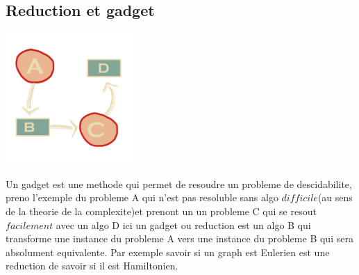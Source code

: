 \documentclass[a4paper,11pt]{article}
\begin{document}
    \subsection{Reduction et gadget}
    \begin{center}
     \hfill\includegraphics[width=5cm]{gadget.png}\hspace*{\fill}
    \end{center}
    Un gadget est une methode qui permet de resoudre un probleme de descidabilite, preno  l'exemple du probleme A qui n'est pas resoluble sans algo $difficile$(au sens de la theorie de la complexite)et prenont un un probleme C qui se resout $facilement$ avec un algo D ici un gadget ou reduction est un algo B qui transforme une instance du probleme A vers une instance du probleme B qui sera absolument equivalente.
    Par exemple savoir si un graph est Eulerien est une reduction de savoir si il est Hamiltonien.
\end{document}
